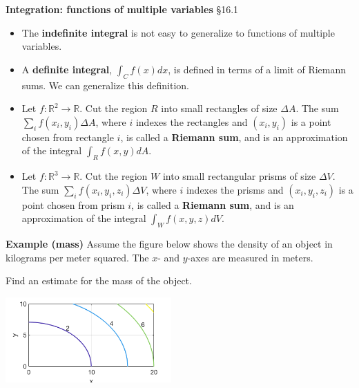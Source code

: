 \documentclass[12pt,letterpaper,noanswers]{exam}
\begin{document}
\noindent\textbf{Integration: functions of multiple variables} \S 16.1
\begin{tcolorbox}
\begin{itemize}
\item The \textbf{indefinite integral} is not easy to generalize to functions of multiple variables.
\item A \textbf{definite integral}, $\int_C f(x)dx$, is defined in terms of a limit of Riemann sums.  We can generalize this definition.  
\item Let $f:\mathbb{R}^2\rightarrow \mathbb{R}$.  Cut the region $R$ into small rectangles of size $\Delta A$.  The sum $\displaystyle\sum\limits_{i}f(x_{i},y_i)\Delta A$, where $i$ indexes the rectangles and $(x_i,y_i)$ is a point chosen from rectangle $i$, is called a \textbf{Riemann sum}, and is an approximation of the integral $\displaystyle\int_{R} f(x,y) dA$.
\item Let $f:\mathbb{R}^3\rightarrow \mathbb{R}$.  Cut the region $W$ into small rectangular prisms of size $\Delta V$.  The sum $\displaystyle\sum\limits_{i}f(x_{i},y_i,z_i)\Delta V$, where $i$ indexes the prisms and $(x_i,y_i,z_i)$ is a point chosen from prism $i$, is called a \textbf{Riemann sum}, and is an approximation of the integral $\displaystyle\int_{W} f(x,y,z) dV$.
\end{itemize}
\end{tcolorbox}





\noindent\textbf{Example (mass)}  Assume the figure below shows the density of an object in kilograms per meter squared.  The $x$- and $y$-axes are measured in meters.

Find an estimate for the mass of the object.  %
\begin{center}
\includegraphics[width=2.5in]{img/C17p3.png}
\end{center}
\vspace{0.5cm}

\vspace{1.5in}


\end{document}
